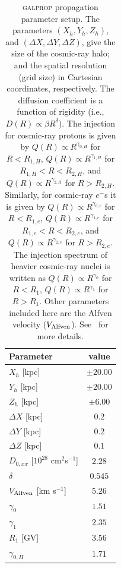 \documentclass[doublespace,nopageskip]{VTthesis}
\begin{document}
\begin{table}[htb!]
\centering
\caption{\textsc{galprop} propagation parameter setup. The parameters $(X_h, Y_h, Z_h)$, and $(\Delta X, \Delta Y, \Delta Z)$, give the size of the cosmic-ray halo; and the spatial resolution (grid size) in Cartesian coordinates, respectively. The diffusion coefficient is a function of rigidity (i.e., $D(R) \propto \beta R^{\delta}$). The injection for cosmic-ray protons is given by $Q(R) \propto R^{\gamma_{0,H}}$ for $R < R_{1,H}$, $Q(R) \propto R^{\gamma_{1,H}}$ for $R_{1,H} < R < R_{2,H}$, and $Q(R) \propto R^{\gamma_{2,H}}$ for $R > R_{2,H}$. Similarly, for cosmic-ray $e^-$s it is given by $Q(R) \propto R^{\gamma_{0,e}}$ for $R < R_{1,e}$, $Q(R) \propto R^{\gamma_{1,e}}$ for $R_{1,e} < R < R_{2,e}$, and $Q(R) \propto R^{\gamma_{2,e}}$ for $R > R_{2,e}$. The injection spectrum of heavier  cosmic-ray nuclei is written as $Q(R) \propto R^{\gamma_0}$ for $R < R_1$, $Q(R) \propto R^{\gamma_1}$ for $ R > R_1$. Other parameters included here are the Alfven velocity ($V_{\rm Alfven}$). See~\citet{2018ApJ...856...45J} for more details.}
\begin{tabular}{lc}
\toprule
Parameter                                              & value\\\hline
$X_h$ [kpc]                                            & $\pm 20.00$\\
$Y_h$ [kpc]                                            & $\pm 20.00$\\
$Z_h$ [kpc]                                            & $\pm 6.00$\\
$\Delta X$ [kpc]                                       & $0.2$\\
$\Delta Y$ [kpc]                                       & $0.2$\\
$\Delta Z$ [kpc]                                       & $0.1$\\
$D_{0,xx}$ [$10^{28}$ cm$^2$s$^{-1}$]                  & $2.28$\\
$\delta$                              & $0.545$\\
$V_{\rm Alfven}$ [km s$^{-1}$]                         & $5.26$ \\
$\gamma_0$                            & $1.51$ \\
$\gamma_1$                            & $2.35$\\
$R_1$ [GV]                            & $3.56$\\
$\gamma_{0,H}$                        & $1.71$\\

\end{tabular}
\end{table}
\end{document}
